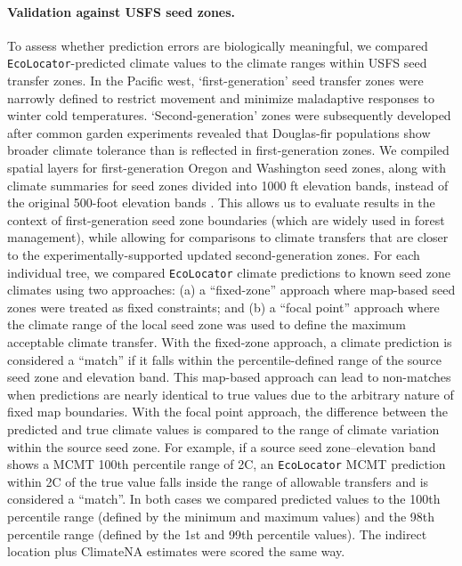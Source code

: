 \documentclass[]{article}
\newcommand{\dfir}{Douglas-fir\xspace}
\newcommand{\ecolocator}{\texttt{EcoLocator}\xspace}
\begin{document}
\paragraph{Validation against USFS seed zones.}
To assess whether prediction errors are biologically meaningful,
we compared \ecolocator-predicted climate values to the climate ranges
within USFS seed transfer zones. In the Pacific west, `first-generation'
seed transfer zones \citep{usdaforestservice_tree_1973} were narrowly
defined to restrict movement and minimize maladaptive responses to winter
cold temperatures. `Second-generation' zones \citep{randall_forest_1996, randall_washington_2002}
were subsequently developed after common garden experiments revealed that
\dfir populations show broader climate tolerance than is reflected in first-generation zones.
We compiled spatial layers for first-generation Oregon and Washington seed zones,
along with climate summaries for seed zones divided into 1000 ft elevation bands,
instead of the original 500-foot elevation bands \citep{shalev_zone_2026}.
This allows us to evaluate results in the context of first-generation seed
zone boundaries (which are widely used in forest management), while allowing for comparisons to climate
transfers that are closer to the experimentally-supported updated second-generation zones.
For each individual tree, we compared \ecolocator climate predictions to known seed zone climates
using two approaches:
(a) a ``fixed-zone'' approach where map-based seed zones were treated as fixed constraints; and
(b) a ``focal point'' approach where the climate range of the local seed zone was used
to define the maximum acceptable climate transfer.
With the fixed-zone approach, a climate prediction is considered a ``match'' if it falls within
the percentile-defined range of the source seed zone and elevation band. This map-based
approach can lead to non-matches when predictions are nearly identical to true values
due to the arbitrary nature of fixed map boundaries.
With the focal point approach, the difference between the predicted
and true climate values is compared to the range of climate variation within the source seed
zone. For example, if a source seed zone--elevation band shows a
MCMT 100th percentile range of 2\textdegree{}C, an \ecolocator MCMT prediction
within 2\textdegree{}C of the true value falls inside the range of allowable transfers
and is considered a ``match''.
In both cases we compared predicted values to the 100th percentile range
(defined by the minimum and maximum values)
and the 98th percentile range (defined by the 1st and 99th percentile values).
The indirect location plus ClimateNA estimates were scored the same way.
\end{document}
